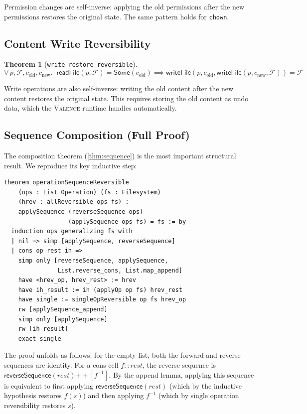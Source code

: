 \documentclass[11pt,a4paper]{article}
\newtheorem{theorem}{Theorem}[section]
\newcommand{\FS}{\mathcal{F}}
\newcommand{\inv}[1]{#1^{-1}}
\newcommand{\valence}{\textsc{Valence}}
\begin{document}
Permission changes are self-inverse: applying the old permissions after the
new permissions restores the original state. The same pattern holds for
\texttt{chown}.

\subsection{Content Write Reversibility}

\begin{theorem}[\texttt{write\_restore\_reversible}]
\label{thm:write}
\[
  \forall\, p, \FS, c_{\text{old}}, c_{\text{new}}.\;\;
  \mathsf{readFile}(p, \FS) = \mathsf{Some}(c_{\text{old}})
  \implies
  \mathsf{writeFile}(p, c_{\text{old}},
    \mathsf{writeFile}(p, c_{\text{new}}, \FS)) = \FS
\]
\end{theorem}

Write operations are also self-inverse: writing the old content after the new
content restores the original state. This requires storing the old content as
undo data, which the \valence{} runtime handles automatically.

\subsection{Sequence Composition (Full Proof)}

The composition theorem (\cref{thm:sequence}) is the most important structural
result. We reproduce its key inductive step:

\begin{lstlisting}[style=leanstyle,caption={The sequence composition proof (inductive step).}]
theorem operationSequenceReversible
    (ops : List Operation) (fs : Filesystem)
    (hrev : allReversible ops fs) :
    applySequence (reverseSequence ops)
                  (applySequence ops fs) = fs := by
  induction ops generalizing fs with
  | nil => simp [applySequence, reverseSequence]
  | cons op rest ih =>
    simp only [reverseSequence, applySequence,
               List.reverse_cons, List.map_append]
    have <hrev_op, hrev_rest> := hrev
    have ih_result := ih (applyOp op fs) hrev_rest
    have single := singleOpReversible op fs hrev_op
    rw [applySequence_append]
    simp only [applySequence]
    rw [ih_result]
    exact single
\end{lstlisting}

The proof unfolds as follows: for the empty list, both the forward and reverse
sequences are identity. For a cons cell $f :: \mathit{rest}$, the reverse
sequence is $\mathsf{reverseSequence}(\mathit{rest}) \mathbin{+\!\!+}
[\inv{f}]$. By the append lemma, applying this sequence is equivalent to first
applying $\mathsf{reverseSequence}(\mathit{rest})$ (which by the inductive
hypothesis restores $f(s)$) and then applying $\inv{f}$ (which by single
operation reversibility restores $s$).
\end{document}
